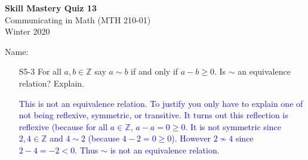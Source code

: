 \documentclass[10pt]{article}
\newcommand{\Z}{\mathbb{Z}}
\newcommand{\blue}{\textcolor{blue}}
\newcommand{\bs}{\begin{solution}}
\begin{document}
\vspace{-1.2in}
\begin{center} \textbf{\Large{Skill Mastery Quiz 13}} \\
Communicating in Math (MTH 210-01)\\
Winter 2020
\end{center}



\noindent Name: 




\begin{itemize}
	


\item[S5-3] For all $a,b\in \Z$ say $a\sim b$ if and only if $a-b\geq 0$.  Is $\sim$ an equivalence relation? Explain.
\bs \blue{This is not an equivalence relation. To justify you only have to explain one of not being reflexive, symmetric, or transitive. It turns out this reflection is reflexive (because for all $a\in\Z$, $a-a=0\geq 0$. It is not symmetric since $2,4\in\Z$ and $4\sim 2$ (because $4-2=0\geq 0$). However $2\not\sim 4$ since $2-4 = -2<0$. Thus $\sim$ is not an equivalence relation.} \end{solution}

\end{itemize}
\end{document}
